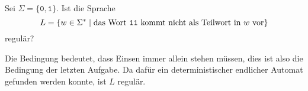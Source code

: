 Sei $\Sigma=\{\texttt{0},\texttt{1}\}$.
Ist die Sprache
\[
L
=
\{
w\in \Sigma^*
\mid
\text{das Wort \texttt{11} kommt nicht als Teilwort in $w$ vor}
\}
\]
regulär?


\begin{loesung}
Die Bedingung bedeutet, dass Einsen immer allein stehen müssen, 
dies ist also die Bedingung der letzten Aufgabe.
Da dafür ein deterministischer endlicher Automat gefunden werden 
konnte, ist $L$ regulär.
\end{loesung}
